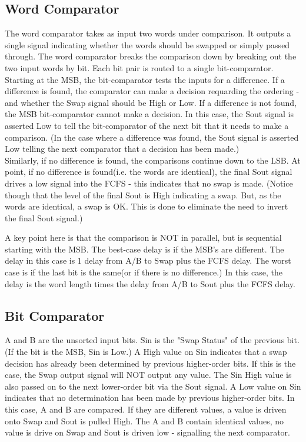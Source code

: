 \documentclass[11pt]{scrartcl}
\begin{document}
\subsection{Word Comparator}
The word comparator takes as input two words under comparison. It outputs a single signal indicating whether the words should be swapped or simply passed through.
The word comparator breaks the comparison down by breaking out the two input words by bit. Each bit pair is routed to a single bit-comparator.  Starting at the MSB, the bit-comparator tests the inputs for a difference. If a difference is found, the comparator can make a decision requarding the ordering - and whether the Swap signal should be High or Low.  If a difference is not found, the MSB bit-comparator cannot make a decision. In this case, the Sout signal is asserted Low to tell the bit-comparator of the next bit that it needs to make a comparison. (In the case where a difference was found, the Sout signal is asserted Low telling the next comparator that a decision has been made.)\\  Similarly, if no difference is found, the comparisons continue down to the LSB.  At point, if no difference is found(i.e. the words are identical), the final Sout signal drives a low signal into the FCFS - this indicates that no swap is made. (Notice though that the level of the final Sout is High indicating a swap. But, as the words are identical, a swap is OK. This is done to eliminate the need to invert the final Sout signal.)

A key point here is that the comparison is NOT in parallel, but is sequential starting with the MSB. The best-case delay is if the MSB's are different. The delay in this case is 1  delay from A/B to Swap plus the FCFS delay.  The worst case is if the last bit is the same(or if there is no difference.) In this case, the delay is the word length times the delay from A/B to Sout plus the FCFS delay.


\subsection{Bit Comparator}


A and B are the unsorted input bits.  Sin is the "Swap Status" of the previous bit. (If the bit is the MSB, Sin is Low.)  A High value on Sin indicates that a swap decision has already been determined by previous higher-order bits.  If this is the case, the Swap output signal will NOT output any value. The Sin High value is also passed on to the next lower-order bit via the Sout signal.
A Low value on Sin indicates that no determination has been made by previous higher-order bits. In this case, A and B are compared. If they are different values, a value is driven onto Swap and Sout is pulled High. The A and B contain identical values, no value is drive on Swap and Sout is driven low - signalling the next comparator.\\
\end{document}
